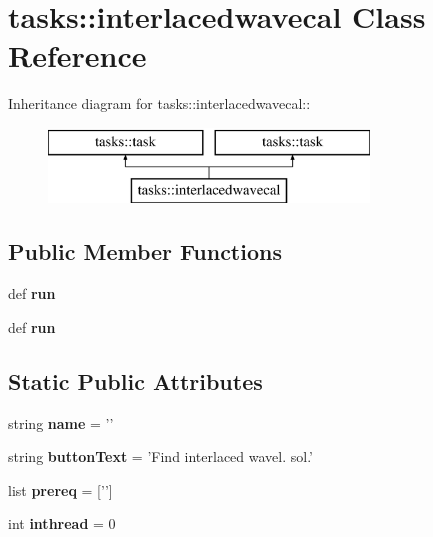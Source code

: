 \section{tasks::interlacedwavecal Class Reference}
\label{classtasks_1_1interlacedwavecal}
Inheritance diagram for tasks::interlacedwavecal::\begin{figure}[H]
\begin{center}
\leavevmode
\includegraphics[height=2cm]{classtasks_1_1interlacedwavecal}
\end{center}
\end{figure}
\subsection*{Public Member Functions}
\begin{CompactItemize}
\item 
def \textbf{run}\label{classtasks_1_1interlacedwavecal_655d3dfa01de46e8e87697a3c15b2a1b}

\item 
def \textbf{run}\label{classtasks_1_1interlacedwavecal_655d3dfa01de46e8e87697a3c15b2a1b}

\end{CompactItemize}
\subsection*{Static Public Attributes}
\begin{CompactItemize}
\item 
string \textbf{name} = '{\bfinterlacedwavecal}'\label{classtasks_1_1interlacedwavecal_251335a48c77ae2f64e3a15a97a3b538}

\item 
string \textbf{button\-Text} = 'Find interlaced wavel. sol.'\label{classtasks_1_1interlacedwavecal_1523b5ec48279a6d7b0d2717d502df92}

\item 
list \textbf{prereq} = ['{\bffindinterlacedord}']\label{classtasks_1_1interlacedwavecal_7701eea0fc0e158326ad333d832fbbc7}

\item 
int \textbf{inthread} = 0\label{classtasks_1_1interlacedwavecal_7575699f1d492ad610df24a9c07cae45}

\end{CompactItemize}


